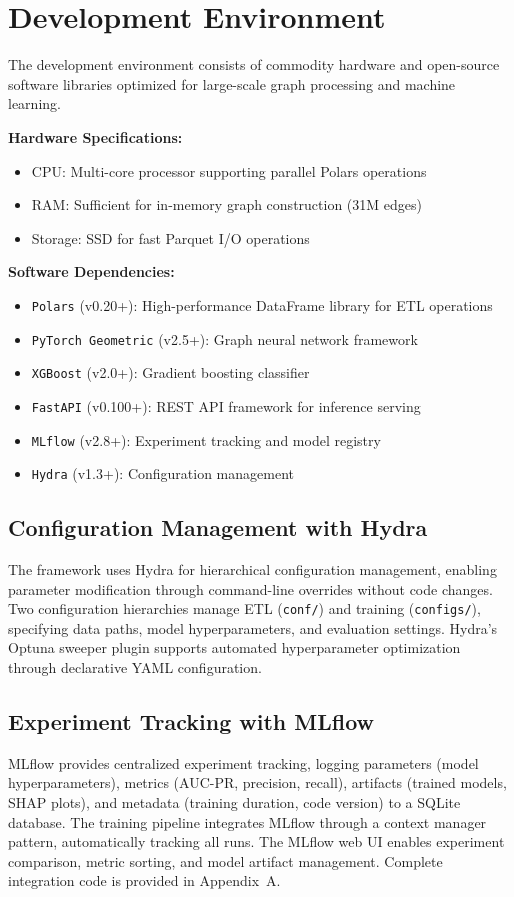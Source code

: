 \section{Development Environment}
\label{sec:4_2}

The development environment consists of commodity hardware and open-source software libraries optimized for large-scale graph processing and machine learning.

\textbf{Hardware Specifications:}
\begin{itemize}
    \item CPU: Multi-core processor supporting parallel Polars operations
    \item RAM: Sufficient for in-memory graph construction (31M edges)
    \item Storage: SSD for fast Parquet I/O operations
\end{itemize}

\textbf{Software Dependencies:}
\begin{itemize}
    \item \texttt{Polars} (v0.20+): High-performance DataFrame library for ETL operations
    \item \texttt{PyTorch Geometric} (v2.5+): Graph neural network framework
    \item \texttt{XGBoost} (v2.0+): Gradient boosting classifier \cite{chen2016xgboost}
    \item \texttt{FastAPI} (v0.100+): REST API framework for inference serving
    \item \texttt{MLflow} (v2.8+): Experiment tracking and model registry
    \item \texttt{Hydra} (v1.3+): Configuration management
\end{itemize}

\subsection{Configuration Management with Hydra}

The framework uses Hydra for hierarchical configuration management, enabling parameter modification through command-line overrides without code changes. Two configuration hierarchies manage ETL (\texttt{conf/}) and training (\texttt{configs/}), specifying data paths, model hyperparameters, and evaluation settings. Hydra's Optuna sweeper plugin supports automated hyperparameter optimization through declarative YAML configuration.

\subsection{Experiment Tracking with MLflow}

MLflow provides centralized experiment tracking, logging parameters (model hyperparameters), metrics (AUC-PR, precision, recall), artifacts (trained models, SHAP plots), and metadata (training duration, code version) to a SQLite database. The training pipeline integrates MLflow through a context manager pattern, automatically tracking all runs. The MLflow web UI enables experiment comparison, metric sorting, and model artifact management. Complete integration code is provided in Appendix~A.
